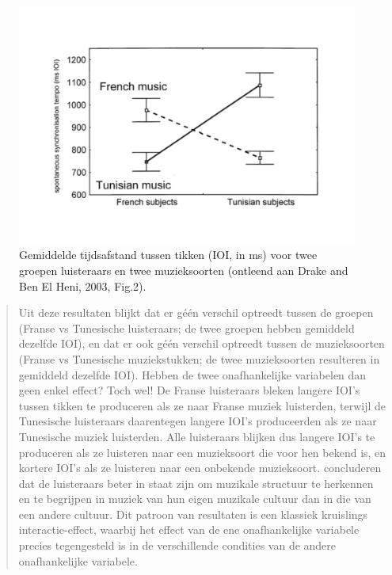 \documentclass[
]{book}
\begin{document}
\begin{figure}

{\centering \includegraphics{figures/DrakeBenElHeni2003Fig2} 

}

\caption{Gemiddelde tijdsafstand tussen tikken (IOI, in ms) voor twee groepen luisteraars en twee muzieksoorten (ontleend aan Drake and Ben El Heni, 2003, Fig.2).}\label{fig:drakebenelheni2003fig2}
\end{figure}

\begin{quote}
Uit deze resultaten blijkt dat er géén verschil optreedt tussen de
groepen (Franse vs Tunesische luisteraars; de twee groepen hebben
gemiddeld dezelfde IOI), en dat er ook géén verschil optreedt tussen de
muzieksoorten (Franse vs Tunesische muziekstukken; de twee muzieksoorten
resulteren in gemiddeld dezelfde IOI). Hebben de twee onafhankelijke
variabelen dan geen enkel effect? Toch wel! De Franse luisteraars bleken
langere IOI's tussen tikken te produceren als ze naar Franse muziek
luisterden, terwijl de Tunesische luisteraars daarentegen langere IOI's
produceerden als ze naar Tunesische muziek luisterden. Alle luisteraars
blijken dus langere IOI's te produceren als ze luisteren naar een
muzieksoort die voor hen bekend is, en kortere IOI's als ze luisteren
naar een onbekende muzieksoort. \citet{Drake03} concluderen dat de luisteraars beter in
staat zijn om muzikale structuur te herkennen en te begrijpen in muziek
van hun eigen muzikale cultuur dan in die van een andere cultuur. Dit
patroon van resultaten is een klassiek kruislings interactie-effect,
waarbij het effect van de ene onafhankelijke variabele precies
tegengesteld is in de verschillende condities van de andere
onafhankelijke variabele.
\end{quote}
\end{document}
